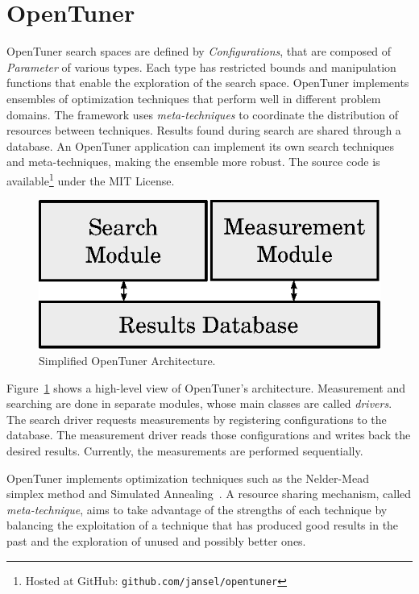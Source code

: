 \documentclass[a4paper, 12pt]{article}
\begin{document}
\section{OpenTuner} \label{sec:opt}

OpenTuner search spaces are defined by \emph{Configurations}, that are composed
of \emph{Parameter} of various types. Each type has restricted bounds and
manipulation functions that enable the exploration of the search space.
OpenTuner implements ensembles of optimization techniques that
perform well in different problem domains. The framework uses
\emph{meta-techniques} to coordinate the distribution of resources
between techniques.
Results found during search are shared through a
database. An OpenTuner application can implement its own search
techniques and meta-techniques, making the ensemble more robust.
The source code is available\footnote{Hosted at GitHub:
\texttt{\scriptsize github.com/jansel/opentuner}} under the MIT License.

\begin{figure}[htpb]
    \centering
    \includegraphics[scale=.62]{opentuner-implementation}
    \caption{Simplified OpenTuner Architecture.}
    \label{fig:ot-imp}
\end{figure}

Figure~\ref{fig:ot-imp} shows a high-level view of OpenTuner's architecture.
Measurement and searching are done in separate modules, whose main classes are
called \emph{drivers}. The search driver requests measurements by registering
configurations to the database. The measurement driver reads those
configurations and writes back the desired results.  Currently, the
measurements are performed sequentially.

OpenTuner implements optimization techniques such as the
Nelder-Mead~\cite{nelder1965simplex} simplex method and Simulated
Annealing~\cite{kirkpatrick1983optimization}. A resource sharing mechanism,
called \emph{meta-technique}, aims to take advantage of the strengths of each
technique by balancing the exploitation of a technique that has produced good
results in the past and the exploration of unused and possibly better ones.
\end{document}
